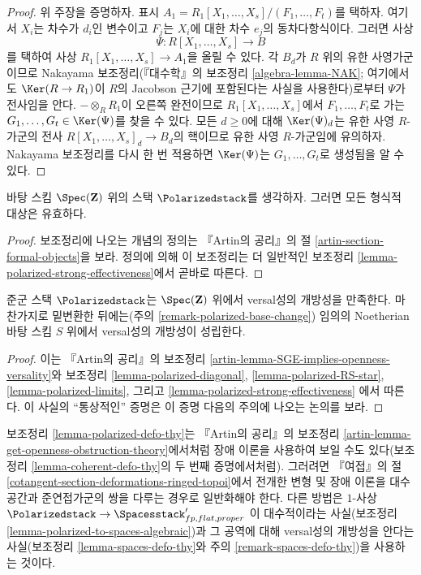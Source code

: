\begin{proof}
\medskip\noindent
위 주장을 증명하자. 표시
$A_1 = R_1[X_1, \ldots, X_s]/(F_1, \ldots, F_t)$를 택하자. 여기서
$X_i$는 차수가 $d_i$인 변수이고 $F_j$는 $X_i$에 대한 차수 $e_j$의
동차다항식이다. 그러면 사상
$$
\Psi : R[X_1, \ldots, X_s] \longrightarrow B
$$
를 택하여 사상 $R_1[X_1, \ldots, X_s] \to A_1$을 올릴 수 있다. 각 $B_d$가
$R$ 위의 유한 사영가군이므로 Nakayama 보조정리(『대수학』의 보조정리
\ref{algebra-lemma-NAK}; 여기에서도 $\Ker(R \to R_1)$이 $R$의 Jacobson 근기에
포함된다는 사실을 사용한다)로부터 $\Psi$가 전사임을 안다.
$- \otimes_R R_1$이 오른쪽 완전이므로 $R_1[X_1, \ldots, X_s]$에서
$F_1, \ldots, F_t$로 가는 $G_1, \ldots, G_t \in \Ker(\Psi)$를 찾을 수 있다.
모든 $d \geq 0$에 대해 $\Ker(\Psi)_d$는 유한 사영 $R$-가군의 전사
$R[X_1, \ldots, X_s]_d \to B_d$의 핵이므로 유한 사영 $R$-가군임에
유의하자. Nakayama 보조정리를 다시 한 번 적용하면 $\Ker(\Psi)$는
$G_1, \ldots, G_t$로 생성됨을 알 수 있다.
\end{proof}

\begin{lemma}
\label{lemma-polarized-existence}
바탕 스킴 $\Spec(\mathbf{Z})$ 위의 스택 $\Polarizedstack$를 생각하자.
그러면 모든 형식적 대상은 유효하다.
\end{lemma}

\begin{proof}
보조정리에 나오는 개념의 정의는 『Artin의 공리』의 절
\ref{artin-section-formal-objects}을 보라. 정의에 의해 이 보조정리는 더 일반적인
보조정리 \ref{lemma-polarized-strong-effectiveness}에서 곧바로 따른다.
\end{proof}

\begin{lemma}
\label{lemma-polarized-defo-thy}
준군 스택 $\Polarizedstack$는 $\Spec(\mathbf{Z})$ 위에서 versal성의 개방성을
만족한다. 마찬가지로 밑변환한 뒤에는(주의
\ref{remark-polarized-base-change}) 임의의 Noetherian 바탕 스킴 $S$ 위에서
versal성의 개방성이 성립한다.
\end{lemma}

\begin{proof}
이는 『Artin의 공리』의 보조정리
\ref{artin-lemma-SGE-implies-openness-versality}와 보조정리
\ref{lemma-polarized-diagonal},
\ref{lemma-polarized-RS-star},
\ref{lemma-polarized-limits}, 그리고
\ref{lemma-polarized-strong-effectiveness}
에서 따른다. 이 사실의 ``통상적인'' 증명은 이 증명 다음의 주의에 나오는
논의를 보라.
\end{proof}

\begin{remark}
\label{remark-polarized-defo-thy}
보조정리 \ref{lemma-polarized-defo-thy}는 『Artin의 공리』의 보조정리
\ref{artin-lemma-get-openness-obstruction-theory}에서처럼 장애 이론을 사용하여
보일 수도 있다(보조정리 \ref{lemma-coherent-defo-thy}의 두 번째 증명에서처럼).
그러려면 『여접』의 절 \ref{cotangent-section-deformations-ringed-topoi}에서
전개한 변형 및 장애 이론을 대수공간과 준연접가군의 쌍을 다루는 경우로
일반화해야 한다. 다른 방법은 $1$-사상
$\Polarizedstack \to \Spacesstack'_{fp, flat, proper}$
이 대수적이라는 사실(보조정리 \ref{lemma-polarized-to-spaces-algebraic})과
그 공역에 대해 versal성의 개방성을 안다는 사실(보조정리
\ref{lemma-spaces-defo-thy}와 주의 \ref{remark-spaces-defo-thy})을 사용하는 것이다.
\end{remark}

